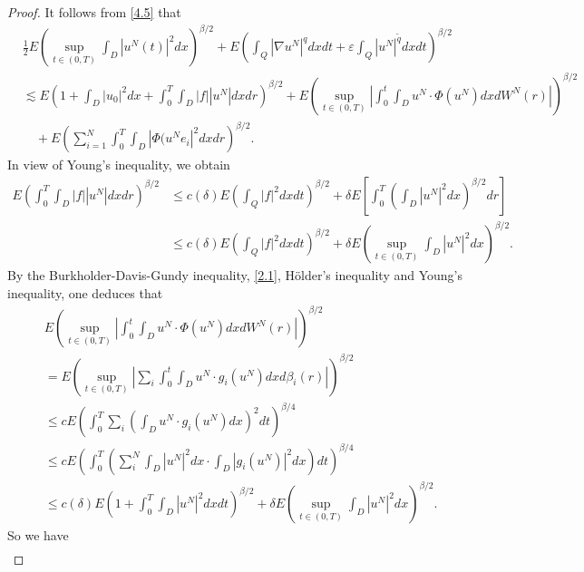 \documentclass[reqno]{amsart}
\theoremstyle{definition}
\theoremstyle{remark}
\numberwithin{equation}{section} \allowdisplaybreaks
\begin{document}
\begin{proof}
It follows from \eqref{4.5} that
\begin{equation*}
\begin{split}
&\frac{1}{2}E\left(\sup_{t\in(0,T)}\int_{D}|u^N(t)|^2dx\right)^{\beta/2}\!\!\!+E\left(\int_Q|\nabla u^N|^qdxdt+\varepsilon\int_Q|u^N|^{\tilde{q}}dxdt\right)^{\beta/2}\\
&\lesssim E\!\left(1\!+\!\int_{D}|u_0|^2dx+\int_0^T\!\!\!\!\int_D|f||u^N|dxdr\right)^{\beta/2}\!\!\!+\!\!E\!
\left(\sup_{t\in(0,T)}\left|\int_0^t\!\!\!\int_{D}u^N\cdot \Phi(u^N)dxdW^N(r)\right|\right)^{\beta/2}\\
&\quad+E\!\left(\sum_{i=1}^N\int_0^T\!\!\!\int_D|\Phi(u^Ne_i|^2dxdr\right)^{\beta/2}.
\end{split}
\end{equation*}
In view of Young's inequality, we obtain
\begin{equation*}
\begin{split}
E\left(\int_0^T\!\!\!\int_D|f||u^N|dxdr\right)^{\beta/2}&\leq c(\delta) E\left(\int_Q|f|^2dxdt\right)^{\beta/2}+
\delta E\left[\int_0^T\left(\int_D|u^N|^2dx\right)^{\beta/2}dr\right]\\
&\leq c(\delta) E\left(\int_Q|f|^2dxdt\right)^{\beta/2}+\delta
E\left(\sup_{t\in(0,T)}\int_D|u^N|^2dx\right)^{\beta/2}.
\end{split}
\end{equation*}
By the Burkholder-Davis-Gundy inequality, \eqref{2.1}, H\"{o}lder's
inequality and Young's inequality, one deduces that
\begin{equation*}
\begin{split}
&E\left(\sup_{t\in(0,T)}\left|\int_0^t\!\!\!\int_{D}u^N\cdot \Phi(u^N)dxdW^N(r)\right|\right)^{\beta/2}\\
&=E\left(\sup_{t\in(0,T)}\left|\sum_{i}\int_0^t\!\!\!\int_{D}u^N\cdot g_i(u^N)dxd\beta_i(r)\right|\right)^{\beta/2}\\
&\leq cE\left(\int_0^T\sum_{i}\left(\int_{D}u^N\cdot g_i(u^N)dx\right)^2dt\right)^{\beta/4}\\
&\leq cE\left(\int_0^T\left(\sum_{i}^N\int_{D}|u^N|^2dx\cdot \int_{D}|g_i(u^N)|^2dx\right)dt\right)^{\beta/4}\\
&\leq c(\delta)
E\left(1+\int_0^T\int_{D}|u^N|^2dxdt\right)^{\beta/2}+\delta
E\left(\sup_{t\in(0,T)}\int_D|u^N|^2dx\right)^{\beta/2}.
\end{split}
\end{equation*}
So we have
\begin{equation*}
\begin{split}

\end{split}
\end{equation*}
\end{proof}
\end{document}
